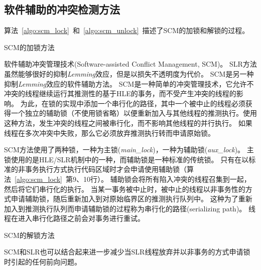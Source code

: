 \subsection{软件辅助的冲突检测方法}

算法~\ref{algo:scm_lock}~和~\ref{algo:scm_unlock}~描述了SCM的加锁和解锁的过程。

\begin{algorithm}[htbp]
\SetAlgoLined
{}
\caption{SCM的加锁方法}
\label{algo:scm_lock}
\end{algorithm}

软件辅助冲突管理技术(Software-assisted Conflict Management, SCM)。
SLR方法虽然能够很好的抑制\textit{Lemming}效应，但是以损失不透明度为代价。
SCM是另一种抑制\textit{Lemming}效应的软件辅助方法。
SCM是一种简单的冲突管理技术，它允许不冲突的线程继续运行其推测性的基于HLE的事务，而不受产生冲突的线程的影响。
为此，在锁的实现中添加一个串行化的路径，其中一个被中止的线程必须获得一个独立的辅助锁（不使用锁省略）以便重新加入与其他线程的推测执行。使用这种方法，发生冲突的线程之间被串行化，而不影响其他线程的并行执行。
如果线程在多次冲突中失败，那么它必须放弃推测执行转而申请原始锁。


SCM方法使用了两种锁，一种为主锁(\textit{main\_lock})，一种为辅助锁(\textit{aux\_lock})。
主锁使用的是HLE/SLR机制中的一种，而辅助锁是一种标准的传统锁。
只有在以标准的非事务执行方式执行代码区域时才会申请使用辅助锁（算法~\ref{algo:scm_lock}~第9、10行）。
辅助锁会将所有陷入冲突的线程召集到一起，然后将它们串行化的执行。
当某一事务被中止时，被中止的线程以非事务性的方式申请辅助锁，随后重新加入到对原始临界区的推测执行队列中。
这种为了重新加入到推测执行队列而申请辅助锁的过程称为串行化的路径(serializing path)。
线程在进入串行化路径之前会对事务进行重试。

\begin{algorithm}[htbp]
\caption{SCM的解锁方法}
\label{algo:scm_unlock}
\end{algorithm}
SCM和SLR也可以结合起来进一步减少当SLR线程放弃并以非事务的方式申请锁时引起的任何前向问题。

